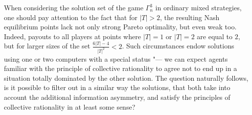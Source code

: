 When considering the solution set of the game $\Gamma^3_n$ in ordinary mixed strategies, one should pay attention to the fact that for $\left| T \right| > 2$, the resulting Nash equilibrium points lack not only strong Pareto optimality, but even weak too. Indeed, payouts to all players at points where $\left| T \right| = 1$ or $\left| T \right| = 2$ are equal to $2$, but for larger sizes of the set $\frac{6 \left| T \right| - 4}{\left| T \right|^2} < 2$. Such circumstances endow solutions using one or two computers with a special status "--- we can expect agents familiar with the principle of collective rationality to agree not to end up in a situation totally dominated by the other solution. The question naturally follows, is it possible to filter out in a similar way the solutions, that both take into account the additional information asymmetry, and satisfy the principles of collective rationality in at least some sense? %

